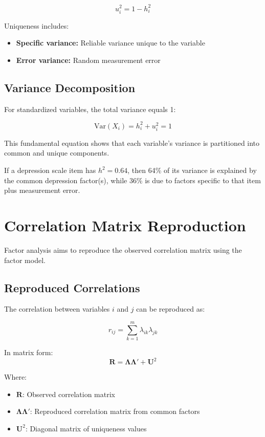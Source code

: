 \documentclass[a4paper]{tufte-book}
\begin{document}
$$u_i^2 = 1 - h_i^2$$

Uniqueness includes:
\begin{itemize}
\item \textbf{Specific variance:} Reliable variance unique to the variable
\item \textbf{Error variance:} Random measurement error
\end{itemize}

\subsection{Variance Decomposition}

For standardized variables, the total variance equals 1:

$$\text{Var}(X_i) = h_i^2 + u_i^2 = 1$$

This fundamental equation shows that each variable's variance is partitioned into common and unique components.

\begin{practicalapplication}
If a depression scale item has $h^2 = 0.64$, then 64\% of its variance is explained by the common depression factor(s), while 36\% is due to factors specific to that item plus measurement error.
\end{practicalapplication}

\section{Correlation Matrix Reproduction}

Factor analysis aims to reproduce the observed correlation matrix using the factor model.

\subsection{Reproduced Correlations}

The correlation between variables $i$ and $j$ can be reproduced as:

$$r_{ij} = \sum_{k=1}^{m} \lambda_{ik}\lambda_{jk}$$

In matrix form:
$$\mathbf{R} = \boldsymbol{\Lambda}\boldsymbol{\Lambda}' + \mathbf{U}^2$$

Where:
\begin{itemize}
\item $\mathbf{R}$: Observed correlation matrix
\item $\boldsymbol{\Lambda}\boldsymbol{\Lambda}'$: Reproduced correlation matrix from common factors
\item $\mathbf{U}^2$: Diagonal matrix of uniqueness values
\end{itemize}
\end{document}
